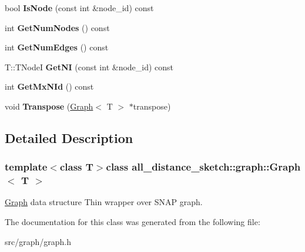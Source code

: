 \begin{DoxyCompactItemize}
\item 
\hypertarget{classall__distance__sketch_1_1graph_1_1Graph_af60cf04a3c05dfffe37f7112b6c48b0c}{}bool {\bfseries Is\+Node} (const int \&node\+\_\+id) const \label{classall__distance__sketch_1_1graph_1_1Graph_af60cf04a3c05dfffe37f7112b6c48b0c}

\item 
\hypertarget{classall__distance__sketch_1_1graph_1_1Graph_ac15516bbdf0a0784ae08f36ffe6d127d}{}int {\bfseries Get\+Num\+Nodes} () const \label{classall__distance__sketch_1_1graph_1_1Graph_ac15516bbdf0a0784ae08f36ffe6d127d}

\item 
\hypertarget{classall__distance__sketch_1_1graph_1_1Graph_af5ec8f358494cd0ee09ebb4a772bdb40}{}int {\bfseries Get\+Num\+Edges} () const \label{classall__distance__sketch_1_1graph_1_1Graph_af5ec8f358494cd0ee09ebb4a772bdb40}

\item 
\hypertarget{classall__distance__sketch_1_1graph_1_1Graph_a13b839edcd7636b5c85a6b8ce3883f9d}{}T\+::\+T\+Node\+I {\bfseries Get\+N\+I} (const int \&node\+\_\+id) const \label{classall__distance__sketch_1_1graph_1_1Graph_a13b839edcd7636b5c85a6b8ce3883f9d}

\item 
\hypertarget{classall__distance__sketch_1_1graph_1_1Graph_a85ded127ea770a1132802e6828ba231a}{}int {\bfseries Get\+Mx\+N\+Id} () const \label{classall__distance__sketch_1_1graph_1_1Graph_a85ded127ea770a1132802e6828ba231a}

\item 
\hypertarget{classall__distance__sketch_1_1graph_1_1Graph_a815e0dd181344a9834b65021f2973887}{}void {\bfseries Transpose} (\hyperlink{classall__distance__sketch_1_1graph_1_1Graph}{Graph}$<$ T $>$ $\ast$transpose)\label{classall__distance__sketch_1_1graph_1_1Graph_a815e0dd181344a9834b65021f2973887}

\end{DoxyCompactItemize}


\subsection{Detailed Description}
\subsubsection*{template$<$class T$>$class all\+\_\+distance\+\_\+sketch\+::graph\+::\+Graph$<$ T $>$}

\hyperlink{classall__distance__sketch_1_1graph_1_1Graph}{Graph} data structure Thin wrapper over S\+N\+A\+P graph. 

The documentation for this class was generated from the following file\+:\begin{DoxyCompactItemize}
\item 
src/graph/graph.\+h\end{DoxyCompactItemize}
